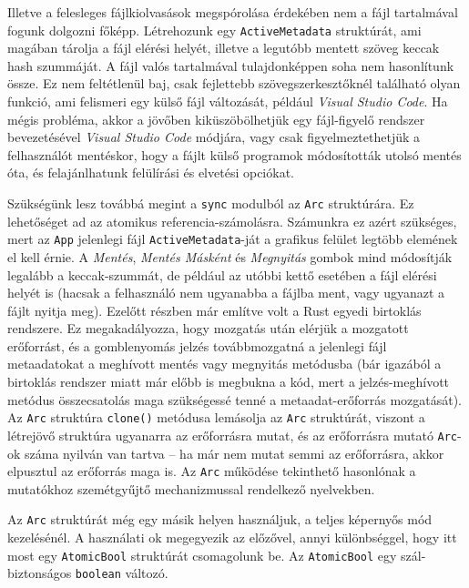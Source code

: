 \label{active_metadata}
Illetve a felesleges fájlkiolvasások megspórolása érdekében nem a fájl tartalmával fogunk dolgozni főképp.
Létrehozunk egy \texttt{ActiveMetadata} struktúrát, ami magában tárolja a fájl elérési helyét,
illetve a legutóbb mentett szöveg keccak hash szummáját.
A fájl valós tartalmával tulajdonképpen soha nem hasonlítunk össze.
Ez nem feltétlenül baj, csak fejlettebb szövegszerkesztőknél található olyan funkció, ami felismeri
egy külső fájl változását, például \textit{Visual Studio Code}.
Ha mégis probléma, akkor a jövőben kiküszöbölhetjük egy fájl-figyelő rendszer bevezetésével \textit{Visual Studio Code} módjára,
vagy csak figyelmeztethetjük a felhasználót mentéskor, hogy a fájlt külső programok módosították utolsó mentés óta,
és felajánlhatunk felülírási és elvetési opciókat.

Szükségünk lesz továbbá megint a \texttt{sync} modulból az \texttt{Arc} struktúrára.
Ez lehetőséget ad az atomikus referencia-számolásra.
Számunkra ez azért szükséges, mert az \texttt{App} jelenlegi fájl \texttt{ActiveMetadata}-ját
a grafikus felület legtöbb elemének el kell érnie.
A \textit{Mentés}, \textit{Mentés Másként} és \textit{Megnyitás} gombok mind módosítják legalább a keccak-szummát,
de például az utóbbi kettő esetében a fájl elérési helyét is (hacsak a felhasználó nem ugyanabba a fájlba ment,
vagy ugyanazt a fájlt nyitja meg).
Ezelőtt  részben már említve volt a Rust egyedi birtoklás rendszere.
Ez megakadályozza, hogy mozgatás után elérjük a mozgatott erőforrást, és a gomblenyomás jelzés
továbbmozgatná a jelenlegi fájl metaadatokat a meghívott mentés vagy megnyitás metódusba
(bár igazából a birtoklás rendszer miatt már előbb is megbukna a kód, mert a jelzés-meghívott metódus
összecsatolás maga szükségessé tenné a metaadat-erőforrás mozgatását).
Az \texttt{Arc} struktúra \texttt{clone()} metódusa lemásolja az \texttt{Arc} struktúrát,
viszont a létrejövő struktúra ugyanarra az erőforrásra mutat, és az erőforrásra mutató \texttt{Arc}-ok
száma nyilván van tartva -- ha már nem mutat semmi az erőforrásra, akkor elpusztul az erőforrás maga is.
Az \texttt{Arc} működése tekinthető hasonlónak a mutatókhoz szemétgyűjtő mechanizmussal rendelkező nyelvekben.

Az \texttt{Arc} struktúrát még egy másik helyen használjuk, a teljes képernyős mód kezelésénél.
A használati ok megegyezik az előzővel, annyi különbséggel, hogy itt most egy \texttt{AtomicBool} struktúrát csomagolunk be.
Az \texttt{AtomicBool} egy szál-biztonságos \texttt{boolean} változó.

